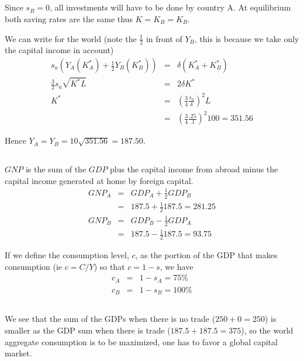 \documentclass[a4paper] {scrartcl}
\begin{document}
\subsection{ }
Since $s_B=0$, all investments will have to be done by country A. 
At equilibrium both saving rates are the same thus $K=K_B=K_B$.

We can write for the world (note the $\frac{1}{2}$ in front of $Y_B$, this is because we take only the capital income in account)
\begin{eqnarray}
	s_a(Y_A(K_A^*)+\frac{1}{2}Y_B(K_B^*))&=&\delta (K_A^*+K_B^*)
	\\
	\frac{3}{2}s_a\sqrt{K^*L} &=& 2\delta K^*
	\\
	K^*&=&\left(\frac{3}{4}\frac{s_a}{\delta}\right)^2L\nonumber\\ 
	&=&\left(\frac{3}{4}\frac{.25}{.1}\right)^2 100%
	=351.56
\end{eqnarray}

Hence $Y_A=Y_B=10\sqrt{351.56}=187.50$.

\subsection{ }
$GNP$ is the sum of the $GDP$ plus the capital income from abroad minus the capital income generated at home by foreign capital.
\begin{eqnarray}
	GNP_A &=& GDP_A + \frac{1}{2}GDP_B\\
	&=& 187.5 + \frac{1}{2}187.5  = 281.25\\
	GNP_B &=& GDP_B - \frac{1}{2}GDP_A\\
	&=& 187.5  - \frac{1}{2}187.5  = 93.75
\end{eqnarray}

If we define the consumption level, $c$, as the portion of the GDP that makes consumption (ie $c = C/Y$) so that $c=1-s$, we have
\begin{eqnarray}
	c_A &=& 1-s_A = 75\%\\ 
	c_B &=& 1-s_B = 100\%
\end{eqnarray}

\subsection{ }
We see that the sum of the GDPs when there is no trade ($250+0=250$) is smaller as the GDP sum when there is trade ($187.5 +187.5 =375$), so the world aggregate consumption is to be maximized, one has to favor a global capital market. 
\end{document}
